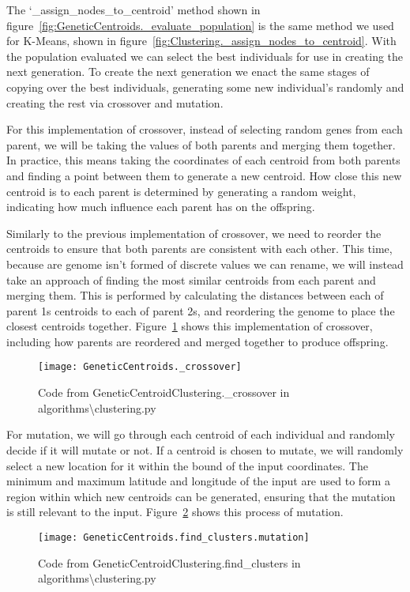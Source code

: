 \noindent
The `\_assign\_nodes\_to\_centroid' method shown in figure~\ref{fig:GeneticCentroids._evaluate_population} is the same
method we used for K-Means, shown in figure~\ref{fig:Clustering._assign_nodes_to_centroid}.
With the population evaluated we can select the best individuals for use in creating the next generation.
To create the next generation we enact the same stages of copying over the best individuals, generating some new
individual's randomly and creating the rest via crossover and mutation.

For this implementation of crossover, instead of selecting random genes from each parent, we will be taking the
values of both parents and merging them together.
In practice, this means taking the coordinates of each centroid from both parents and finding a point between them
to generate a new centroid.
How close this new centroid is to each parent is determined by generating a random weight, indicating how much
influence each parent has on the offspring.

\noindent
Similarly to the previous implementation of crossover, we need to reorder the centroids to ensure that both parents
are consistent with each other.
This time, because are genome isn't formed of discrete values we can rename, we will instead take an approach of
finding the most similar centroids from each parent and merging them.
This is performed by calculating the distances between each of parent 1s centroids to each of parent 2s, and
reordering the genome to place the closest centroids together.
Figure~\ref{fig:GeneticCentroids._crossover} shows this implementation of crossover, including how parents are
reordered and merged together to produce offspring.
\begin{figure}[H]
    \centering
    \texttt{[image: GeneticCentroids.\_crossover]}
    \caption{Code from GeneticCentroidClustering.\_crossover in algorithms\textbackslash clustering.py}
    \label{fig:GeneticCentroids._crossover}
\end{figure}

\noindent
For mutation, we will go through each centroid of each individual and randomly decide if it will mutate or not.
If a centroid is chosen to mutate, we will randomly select a new location for it within the bound of the input
coordinates.
The minimum and maximum latitude and longitude of the input are used to form a region within which new centroids can
be generated, ensuring that the mutation is still relevant to the input.
Figure~\ref{fig:GeneticCentroids.find_clusters.mutation} shows this process of mutation.
\begin{figure}
    \centering
    \texttt{[image: GeneticCentroids.find\_clusters.mutation]}
    \caption{Code from GeneticCentroidClustering.find\_clusters in algorithms\textbackslash clustering.py}
    \label{fig:GeneticCentroids.find_clusters.mutation}
\end{figure}

